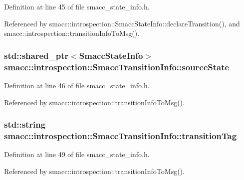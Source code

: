 Definition at line 45 of file smacc\+\_\+state\+\_\+info.\+h.



Referenced by smacc\+::introspection\+::\+Smacc\+State\+Info\+::declare\+Transition(), and smacc\+::introspection\+::transition\+Info\+To\+Msg().

\subsubsection[{\texorpdfstring{source\+State}{sourceState}}]{\setlength{\rightskip}{0pt plus 5cm}std\+::shared\+\_\+ptr$<${\bf Smacc\+State\+Info}$>$ smacc\+::introspection\+::\+Smacc\+Transition\+Info\+::source\+State}\hypertarget{structsmacc_1_1introspection_1_1SmaccTransitionInfo_aa44f16d098eb91ed222008fe0abf1275}{}\label{structsmacc_1_1introspection_1_1SmaccTransitionInfo_aa44f16d098eb91ed222008fe0abf1275}


Definition at line 46 of file smacc\+\_\+state\+\_\+info.\+h.



Referenced by smacc\+::introspection\+::transition\+Info\+To\+Msg().

\subsubsection[{\texorpdfstring{transition\+Tag}{transitionTag}}]{\setlength{\rightskip}{0pt plus 5cm}std\+::string smacc\+::introspection\+::\+Smacc\+Transition\+Info\+::transition\+Tag}\hypertarget{structsmacc_1_1introspection_1_1SmaccTransitionInfo_aece8c6af9a682232a435ca1d92b953bd}{}\label{structsmacc_1_1introspection_1_1SmaccTransitionInfo_aece8c6af9a682232a435ca1d92b953bd}


Definition at line 49 of file smacc\+\_\+state\+\_\+info.\+h.



Referenced by smacc\+::introspection\+::transition\+Info\+To\+Msg().

